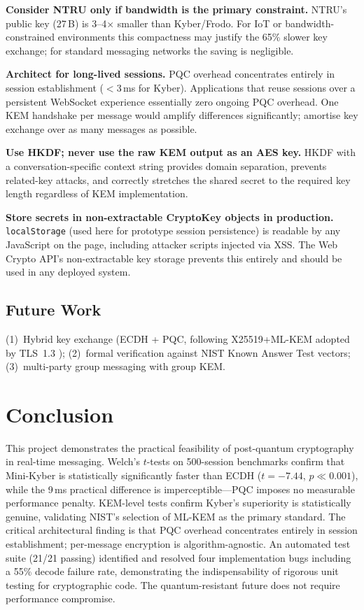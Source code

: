 \documentclass[11pt,a4paper]{article}
\begin{document}
\textbf{Consider NTRU only if bandwidth is the primary constraint.} NTRU's public key (27\,B) is 3--4$\times$ smaller than Kyber/Frodo. For IoT or bandwidth-constrained environments this compactness may justify the 65\% slower key exchange; for standard messaging networks the saving is negligible.

\textbf{Architect for long-lived sessions.} PQC overhead concentrates entirely in session establishment ($<$3\,ms for Kyber). Applications that reuse sessions over a persistent WebSocket experience essentially zero ongoing PQC overhead. One KEM handshake per message would amplify differences significantly; amortise key exchange over as many messages as possible.

\textbf{Use HKDF; never use the raw KEM output as an AES key.} HKDF with a conversation-specific context string provides domain separation, prevents related-key attacks, and correctly stretches the shared secret to the required key length regardless of KEM implementation.

\textbf{Store secrets in non-extractable CryptoKey objects in production.} \texttt{localStorage} (used here for prototype session persistence) is readable by any JavaScript on the page, including attacker scripts injected via XSS. The Web Crypto API's non-extractable key storage prevents this entirely and should be used in any deployed system.

\subsection{Future Work}

(1)~Hybrid key exchange (ECDH + PQC, following X25519+ML-KEM adopted by TLS~1.3 \cite{tls13}); (2)~formal verification against NIST Known Answer Test vectors; (3)~multi-party group messaging with group KEM.

\section{Conclusion}

This project demonstrates the practical feasibility of post-quantum cryptography in real-time messaging. Welch's $t$-tests on 500-session benchmarks confirm that Mini-Kyber is statistically significantly faster than ECDH ($t=-7.44$, $p\ll0.001$), while the 9\,ms practical difference is imperceptible---PQC imposes no measurable performance penalty. KEM-level tests confirm Kyber's superiority is statistically genuine, validating NIST's selection of ML-KEM as the primary standard. The critical architectural finding is that PQC overhead concentrates entirely in session establishment; per-message encryption is algorithm-agnostic. An automated test suite (21/21 passing) identified and resolved four implementation bugs including a 55\% decode failure rate, demonstrating the indispensability of rigorous unit testing for cryptographic code. The quantum-resistant future does not require performance compromise.
\end{document}
